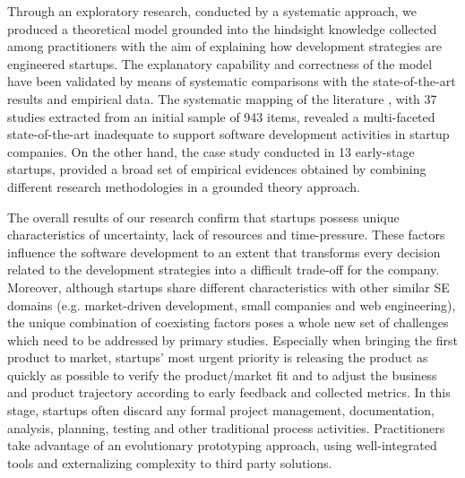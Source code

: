 \documentclass[10pt,journal,letterpaper,compsoc]{IEEEtran}
\begin{document}
Through an exploratory research, conducted by a systematic approach, we 
produced a theoretical model grounded into the hindsight knowledge collected 
among practitioners with the aim of explaining how development strategies are 
engineered startups. The explanatory capability and correctness of the model 
have been validated by means of systematic comparisons with the state-of-the-art 
results and empirical data. The systematic mapping of the literature \cite{SMS}, 
with 37 studies extracted from an initial sample of 943 items, revealed a 
multi-faceted state-of-the-art inadequate to support software development 
activities in startup companies. %
On the other hand, the case study conducted in 13 early-stage startups, 
provided a broad set of empirical evidences obtained by combining different 
research methodologies in a grounded theory approach.

The overall results of our research confirm that startups possess unique %
characteristics of uncertainty, lack of resources and time-pressure. These 
factors influence the software development to an extent that transforms every 
decision related to the development strategies into a difficult trade-off for 
the company. Moreover, although startups share different characteristics with 
other similar SE domains (e.g. market-driven development, small companies and 
web engineering), the unique combination of coexisting factors poses a whole new 
set of challenges which need to be addressed by primary studies. Especially when 
bringing the first product to market, startups' most urgent priority is 
releasing the product as quickly as possible to verify the product/market fit 
and to adjust the business and product trajectory according to early feedback 
and collected metrics. In this stage, startups often discard any formal project 
management, documentation, analysis, planning, testing and other traditional 
process activities. Practitioners take advantage of an evolutionary prototyping 
approach, using well-integrated tools and externalizing complexity to third 
party solutions.
\end{document}
